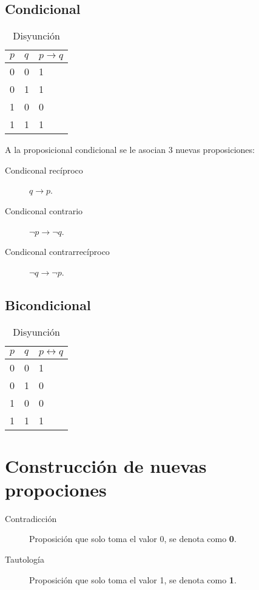 \subsection{Condicional}

\begin{table}[htbp]
  \centering
  \begin{tabular}{|l|l|l|}
    \hline
    $p$ & $q$ & $p \rightarrow q$ \\
    \hline
    0 & 0 & 1\\
    0 & 1 & 1\\
    1 & 0 & 0\\
    1 & 1 & 1\\
    \hline
  \end{tabular}
  \caption{Disyunción}
\end{table}

A la proposicional condicional se le asocian 3 nuevas proposiciones:
\begin{description}
 \item[Condiconal recíproco] $q \rightarrow p$.
 \item[Condiconal contrario] $\neg p \rightarrow \neg q$.
 \item[Condiconal contrarrecíproco] $\neg q \rightarrow \neg p$.
\end{description}

\subsection{Bicondicional}

\begin{table}[htbp]
  \centering
  \begin{tabular}{|l|l|l|}
    \hline
    $p$ & $q$ & $p \leftrightarrow q$ \\
    \hline
    0 & 0 & 1\\
    0 & 1 & 0\\
    1 & 0 & 0\\
    1 & 1 & 1\\
    \hline
  \end{tabular}
  \caption{Disyunción}
\end{table}

\section{Construcción de nuevas propociones}

\begin{description}
 \item[Contradicción] Proposición que solo toma el valor 0, se denota como 
\textbf{0}.
 \item[Tautología] Proposición que solo toma el valor 1, se denota como 
\textbf{1}.
\end{description}

